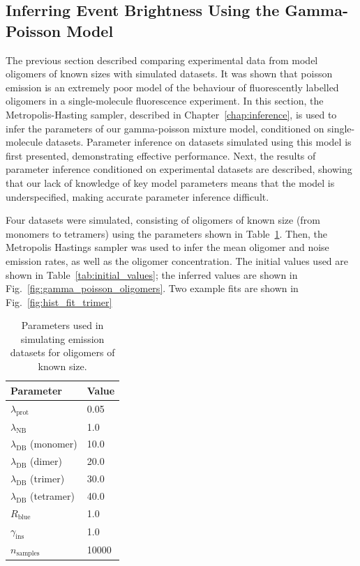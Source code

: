 \clearpage

\subsection{Inferring Event Brightness Using the Gamma-Poisson Model}
The previous section described comparing experimental data from model oligomers of known sizes with simulated datasets. It was shown that poisson emission is an extremely poor model of the behaviour of fluorescently labelled oligomers in a single-molecule fluorescence experiment. In this section, the Metropolis-Hasting sampler, described in Chapter~\autoref{chap:inference}, is used to infer the parameters of our gamma-poisson mixture model, conditioned on single-molecule datasets. Parameter inference on datasets simulated using this model is first presented, demonstrating effective performance. Next, the results of parameter inference conditioned on experimental datasets are described, showing that our lack of knowledge of key model parameters means that the model is underspecified, making accurate parameter inference difficult.

Four datasets were simulated, consisting of oligomers of known size (from monomers to tetramers) using the parameters shown in Table~\ref{tab:oligomer_params}. Then, the Metropolis Hastings sampler was used to infer the mean oligomer and noise emission rates, as well as the oligomer concentration. The initial values used are shown in Table~\ref{tab:initial_values}; the inferred values are shown in Fig.~\ref{fig:gamma_poisson_oligomers}. Two example fits are shown in Fig.~\ref{fig:hist_fit_trimer}

\begin{center}
\begin{table}[!ht]
\caption{Parameters used in simulating emission datasets for oligomers of known size.}
\begin{tabular}{|l|l|}
\hline
{\bf Parameter} & {\bf Value}\\ \hline
$\lambda_{\text{prot}}$ & 0.05\\
$\lambda_{\text{NB}}$ & 1.0\\
$\lambda_{\text{DB}}$ (monomer) & 10.0\\
$\lambda_{\text{DB}}$ (dimer) & 20.0\\
$\lambda_{\text{DB}}$ (trimer) & 30.0\\
$\lambda_{\text{DB}}$ (tetramer) & 40.0\\
$R_{\text{blue}}$ & 1.0\\
$\gamma_{\text{ins}}$ & 1.0\\
$n_{\text{samples}}$ & 10000\\ \hline
\end{tabular}
\label{tab:oligomer_params}
\end{table}
\end{center}

